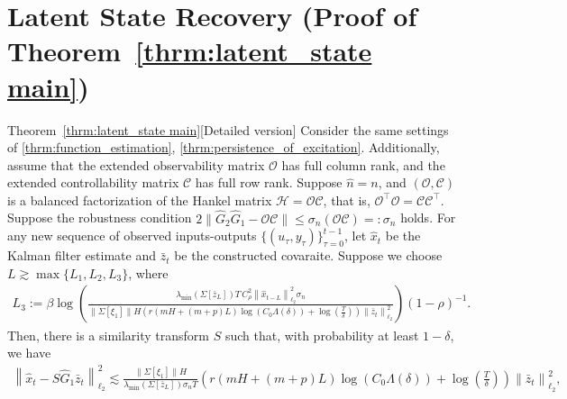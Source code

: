 \documentclass[11pt]{article}
\newcommand{\zbar}{\bar{z}}
\newcommand{\xtil}{\hat{x}}
\newcommand{\Ccal}{\mathcal{C}}
\newcommand{\Hcal}{\mathcal{H}}
\newcommand{\Ocal}{\mathcal{O}}
\newcommand{\tn}[1]{\left\|{#1}\right\|_{\ell_2}}
\newcommand{\norm}[1]{\|{#1} \|}
\newcommand{\T}{\top}
\newcommand{\<}{\langle}
\renewcommand{\>}{\rangle}
\numberwithin{equation}{section}
\begin{document}
\section{Latent State Recovery (Proof of Theorem~\ref{thrm:latent_state main})}\label{app:latent_state}
\begin{customtheorem}{Theorem~\ref{thrm:latent_state main}}[Detailed version]\label{thrm:latent_state}
	Consider the same settings of \ref{thrm:function_estimation}, \ref{thrm:persistence_of_excitation}. Additionally, assume that the extended observability matrix $\Ocal$ has full column rank, and the extended controllability matrix $\Ccal$ has full row rank. Suppose $\hat n = n$, and $(\Ocal,\Ccal)$ is a balanced factorization of the Hankel matrix $\Hcal = \Ocal \Ccal$, that is, $\Ocal^\T \Ocal= \Ccal \Ccal^\T$. Suppose the robustness condition $2 \norm{\hat{G}_2 \hat{G}_1 - \Ocal \Ccal}\leq \sigma_{n}\left(\Ocal \Ccal\right) =: \sigma_n$ holds. For any new sequence of observed inputs-outputs $\{(u_\tau,y_\tau)\}_{\tau = 0}^{t-1}$, let $\xtil_t$ be the Kalman filter estimate and $\zbar_t$ be the constructed covaraite. Suppose we choose $L \gtrsim \max \{L_1, L_2, L_3\}$, where
	\begin{align*}
		L_3 := \beta \log\left( \frac{\lambda_{\min}\left( \Sigma[\zbar_L]\right) T\,C_{\rho}^2\tn{\xtil_{t-L}}^2 \sigma_n}{\norm{\Sigma[\xi_1]}H\left( r \left(mH + (m+p)L \right)\log \left(C_0 \Lambda(\delta)\right) + \log \left(\frac{T}{\delta}\right) \right)\tn{\zbar_t}^2} \right)(1-\rho)^{-1}.
	\end{align*}
	Then, there is a similarity transform $S$ such that, with probability at least $1-\delta$, we have 
	\begin{align*}
		\tn{\xtil_t - S \hat{G}_1 \zbar_{t}}^2 {\lesssim}  \frac{\norm{\Sigma[\xi_1]}H}{\lambda_{\min}\left( \Sigma[\zbar_L]\right) \sigma_n T}  \left( r \left(mH + (m+p)L \right)\log \left(C_0 \Lambda(\delta)\right) + \log \left(\frac{T}{\delta}\right) \right) \tn{\zbar_t}^2,
	\end{align*}
\end{customtheorem}
\end{document}
